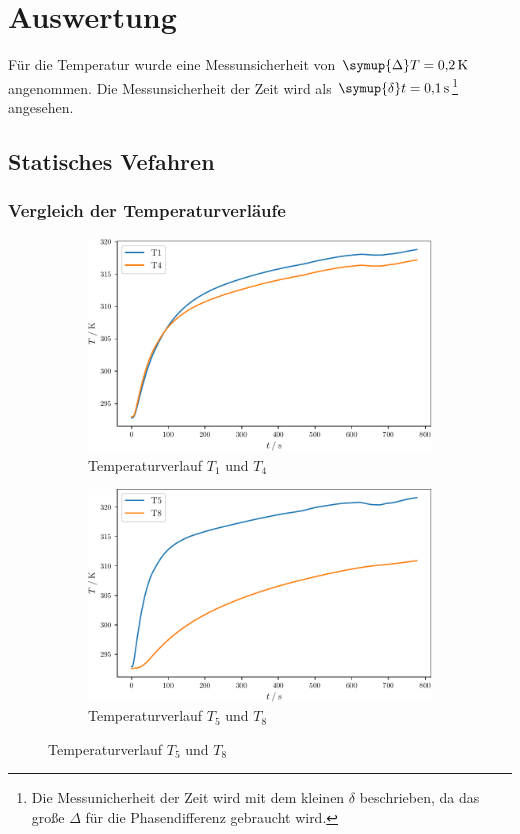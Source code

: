 \section{Auswertung}
\label{sec:Auswertung}
Für die Temperatur wurde eine Messunsicherheit von $\symup{\Delta} T = \SI{0.2}{\kelvin}$ angenommen. Die Messunsicherheit der Zeit wird als
$\symup{\delta} t = \SI{0.1}{\second}$\footnote{Die Messunicherheit der Zeit wird mit dem kleinen $\delta$ beschrieben, 
da das große $\Delta$ für die Phasendifferenz gebraucht wird.} angesehen.
\subsection{Statisches Vefahren}  
\subsubsection{Vergleich der Temperaturverläufe}
\begin{figure}
  \begin{subfigure}{0.48\textwidth}
    \centering
    \includegraphics[width = \textwidth]{build/stat14.pdf}
    \caption{Temperaturverlauf $T_1$ und $T_4$}
    \label{fig:stat14}
  \end{subfigure}
  \begin{subfigure}{0.48\textwidth}
    \centering
    \includegraphics[width = \textwidth]{build/stat58.pdf}
    \caption{Temperaturverlauf $T_5$ und $T_8$}
    \label{fig:stat58}
  \end{subfigure}
\end{figure}
